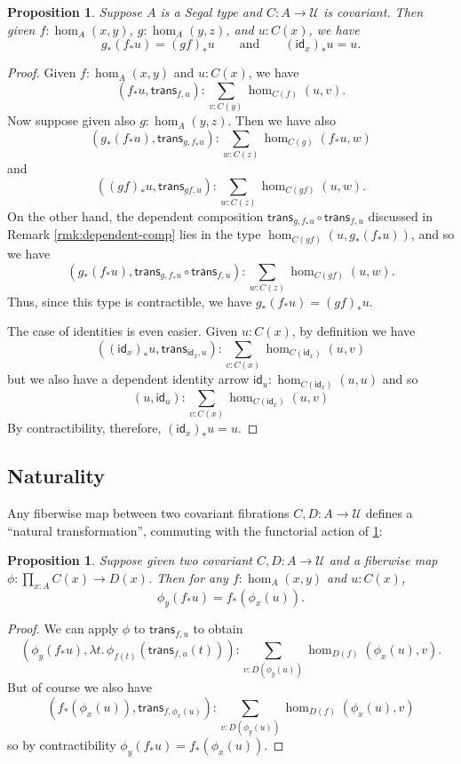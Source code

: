 \documentclass[12pt]{amsart}
\theoremstyle{plain}
\newtheorem{prop}[thm]{Proposition}
\theoremstyle{definition}
\theoremstyle{remark}
\numberwithin{equation}{section}
\newcommand{\univtype}{\mathcal{U}}
\newcommand{\lam}[1]{\lambda #1.\,}
\newcommand{\idarr}[1]{\mathsf{id}_{#1}}
\newcommand{\covtr}[1]{{#1}_*}  %
\newcommand{\istrans}[2]{\mathsf{trans}_{#1,#2}}
\begin{document}
\begin{prop}\label{prop:functorial-fibration} Suppose $A$ is a Segal type and $C:A\to\univtype$ is covariant. Then given $f:\hom_A(x,y)$, $g:\hom_A(y,z)$, and $u:C(x)$, we have 
\[\covtr g (\covtr f u) = \covtr{(gf)} u \qquad \mathrm{and} \qquad \covtr{(\idarr x)}u = u.\]
\end{prop}
\begin{proof}
Given $f:\hom_A(x,y)$ and $u:C(x)$, we have
\[ (\covtr f u, \istrans{f}{u}) : \sum_{v:C(y)} \hom_{C(f)}(u,v).\] 
Now suppose given also $g:\hom_A(y,z)$.
Then we have also
\[(\covtr g (\covtr f u), \istrans g {\covtr f u}) : \sum_{w:C(z)} \hom_{C(g)}(\covtr f u,w)\]
and
\[(\covtr{(gf)} u, \istrans{gf}{u}) : \sum_{w:C(z)} \hom_{C(gf)}(u,w). \]
On the other hand, the dependent composition $\istrans g {\covtr f u} \circ \istrans f u$ discussed in Remark \ref{rmk:dependent-comp} lies in the type $\hom_{C(gf)}(u,\covtr g (\covtr f u))$, and so we have
\[(\covtr g (\covtr f u),\istrans g {\covtr f u} \circ \istrans f u) : \sum_{w:C(z)} \hom_{C(gf)}(u,w). \]
Thus, since this type is contractible, we have $\covtr g (\covtr f u) = \covtr{(gf)} u$.

The case of identities is even easier.
Given $u:C(x)$, by definition we have
\[(\covtr{(\idarr x)}u,\istrans {\idarr x}u):\sum_{v:C(x)}\hom_{C(\idarr x)}(u,v)\]
but we also have a dependent identity arrow $\idarr u : \hom_{C(\idarr x)}(u,u)$ and so
\[(u,\idarr u) : \sum_{v:C(x)}\hom_{C(\idarr x)}(u,v) \]
By contractibility, therefore, $\covtr{(\idarr x)}u = u$.
\end{proof}


\subsection{Naturality}
\label{sec:covar-nat}

Any fiberwise map between two covariant fibrations $C,D:A\to\univtype$ defines a ``natural transformation'', commuting with the functorial action of \cref{prop:functorial-fibration}:

\begin{prop}\label{prop:natural-fibration}
Suppose given two covariant $C,D:A\to\univtype$ and a fiberwise map $\phi:\prod_{x:A} C(x) \to D(x)$.
Then for any $f:\hom_A(x,y)$ and $u:C(x)$, \[\phi_y(\covtr f u)= \covtr f (\phi_x(u)).\]
\end{prop}
\begin{proof}
We can apply $\phi$ to $\istrans f u$ to obtain
\[ (\phi_y(\covtr f u), \lam{t}\phi_{f(t)}(\istrans f u(t))) : \sum_{v:D(\phi_y(u))} \hom_{D(f)}(\phi_x(u),v). \]
But of course we also have
\[ (\covtr f (\phi_x(u)), \istrans f {\phi_x(u)}) : \sum_{v:D(\phi_y(u))} \hom_{D(f)}(\phi_x(u),v) \]
so by contractibility $\phi_y(\covtr f u)= \covtr f (\phi_x(u))$.
\end{proof}
\end{document}
